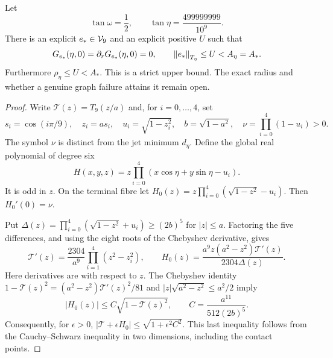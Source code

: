 \documentclass[11pt,a4paper]{article}
\begin{document}
\begin{example}\label{ex:F}
Let
\begin{equation}\label{eq:Fexample}
 \tan\omega=\frac12,\qquad
 \tan\eta=\frac{499999999}{10^9}.
\end{equation}
There is an explicit $e_*\in\mathcal V_9$ and an explicit positive $U$
such that
\[
 G_{e_*}(\eta,0)=\partial_rG_{e_*}(\eta,0)=0,\qquad
 \left\lVert e_*\right\rVert_{T_\eta}\le U<A_\eta=A_*.
\]
Furthermore $\rho_\eta\le U<A_*$. This is a strict upper
bound. The exact radius and whether a genuine graph failure attains
it remain open.
\end{example}
\begin{proof}
Write $\mathcal T(z)=T_9(z/a)$ and, for $i=0,\ldots,4$, set
\[
 s_i=\cos(i\pi/9),\quad z_i=as_i,\quad
 u_i=\sqrt{1-z_i^2},\quad b=\sqrt{1-a^2},
 \quad \nu=\prod_{i=0}^4(1-u_i)>0.
\]
The symbol $\nu$ is distinct from the jet minimum $d_\eta$.
Define the global real polynomial of degree six
\begin{equation}\label{eq:Fglobal}
 H(x,y,z)=z\prod_{i=0}^4(x\cos\eta+y\sin\eta-u_i).
\end{equation}
It is odd in $z$. On the terminal fibre let
$H_0(z)=z\prod_{i=0}^4(\sqrt{1-z^2}-u_i)$.
Then $H_0'(0)=\nu$.

Put $\Delta(z)=\prod_{i=0}^4(\sqrt{1-z^2}+u_i)\ge(2b)^5$
for $|z|\le a$. Factoring the five differences, and using
the eight roots of the Chebyshev derivative, gives
\[
 \mathcal T'(z)=\frac{2304}{a^9}
                      \prod_{i=1}^4(z^2-z_i^2),\qquad
 H_0(z)=\frac{a^9 z(a^2-z^2)\mathcal T'(z)}
                              {2304\Delta(z)}.
\]
Here derivatives are with respect to $z$.
The Chebyshev identity
$1-\mathcal T(z)^2=(a^2-z^2)\mathcal T'(z)^2/81$
and $|z|\sqrt{a^2-z^2}\le a^2/2$ imply
\begin{equation}\label{eq:Fterminalbound}
 |H_0(z)|\le C\sqrt{1-\mathcal T(z)^2},\qquad
 C=\frac{a^{11}}{512(2b)^5}.
\end{equation}
Consequently, for $\epsilon>0$,
$|\mathcal T+\epsilon H_0|\le\sqrt{1+\epsilon^2C^2}$.
This last inequality follows from the Cauchy--Schwarz
inequality in two dimensions, including the contact points.


\end{proof}
\end{document}
